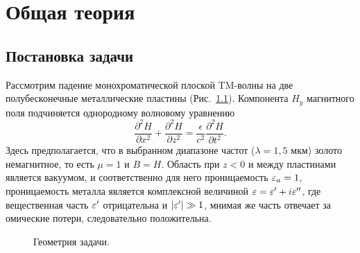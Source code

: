 \chapter{Общая теория}
\section{Постановка задачи}
 

 Рассмотрим падение монохроматической плоской TM-волны на две полубесконечные металлические пластины (Рис.~\ref{fig:geom}). 
 Компонента $H_y$ магнитного поля подчиняется однородному волновому уравнению 
 \begin{equation}
   \frac{\partial^2 H}{\partial x^2} +   \frac{\partial^2 H}{\partial z^2} = \frac{\epsilon}{c^2}\frac{\partial^2 H}{\partial t^2}.
 \end{equation}
 Здесь предполагается, что в выбранном диапазоне частот ($\lambda = 1,5$ мкм) золото немагнитное, то есть $\mu = 1$ и $B = H$. Область при $z<0$ 
 и между пластинами является вакуумом, и соответственно для него проницаемость $\varepsilon_a = 1$, проницаемость металла является
 комплексной величиной $\varepsilon = \varepsilon' + i \varepsilon''$, где вещественная часть $\varepsilon'$ отрицательна и $\lvert\varepsilon'\rvert \gg 1$, мнимая же часть 
 отвечает за омические потери, следовательно положительна. 
\begin{figure}
\begin{center}
    
\end{center}
\caption{Геометрия задачи.}
\label{fig:geom}
\end{figure}

